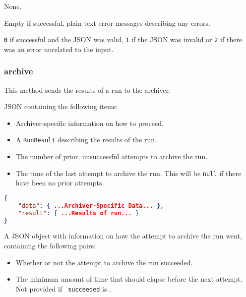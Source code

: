 \documentclass[10pt,titlepage]{article}
\begin{document}
 None.

 Empty if successful, plain text error
messages describing any errors.

 {\tt 0} if successful and the JSON was
valid, {\tt 1} if the JSON was invalid or {\tt 2} if there was an
error unrelated to the input.


\subsubsection{archive}

This method sends the results of a run to the archiver.

 JSON containing the following items:


\begin{itemize}
\item {} Archiver-specific information on how to proceed.

\item {} A {\tt RunResult} describing
  the results of the run.

\item {} The number of prior, unsuccessful
  attempts to archive the run.

\item {} The time of the last attempt
  to archive the run.  This will be {\tt null} if there have been no
  prior attempts.
\end{itemize}

\example
\begin{lstlisting}[language=json,firstnumber=1]
{
    "data": { ...Archiver-Specific Data... },
    "result": { ...Results of run... }
}
\end{lstlisting}


 A JSON object with information on how
the attempt to archive the run went, containing the following pairs:

\begin{itemize}
\item {} Whether or not the attempt to archive
the run succeeded.
\item {} The minimum amount of time that
  should elapse before the next attempt.  Not provided if {\tt
    succeeded} is \false.
\end{itemize}
\end{document}
